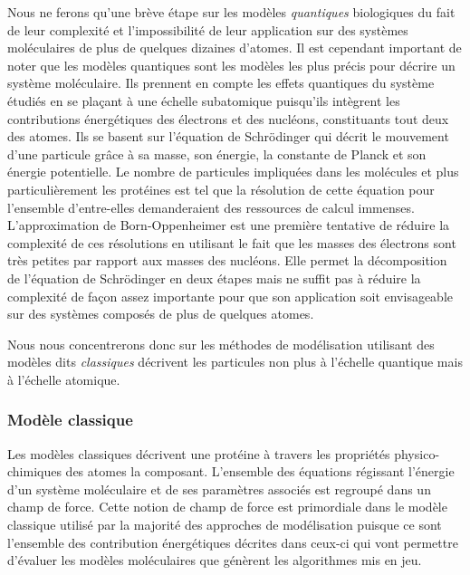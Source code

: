 Nous ne ferons qu'une brève étape sur les modèles \textit{quantiques} biologiques du fait de leur complexité et l'impossibilité de leur application sur des systèmes moléculaires de plus de quelques dizaines d'atomes. Il est cependant important de noter que les modèles quantiques sont les modèles les plus précis pour décrire un système moléculaire. Ils prennent en compte les effets quantiques du système étudiés en se plaçant à une échelle subatomique puisqu'ils intègrent les contributions énergétiques des électrons et des nucléons, constituants tout deux des atomes. Ils se basent sur l'équation de Schrödinger \cite{schrodinger1926undulatory} qui décrit le mouvement d'une particule grâce à sa masse, son énergie, la constante de Planck et son énergie potentielle. Le nombre de particules impliquées dans les molécules et plus particulièrement les protéines est tel que la résolution de cette équation pour l'ensemble d'entre-elles demanderaient des ressources de calcul immenses. L'approximation de Born-Oppenheimer \cite{} est une première tentative de réduire la complexité de ces résolutions en utilisant le fait que les masses des électrons sont très petites par rapport aux masses des nucléons. Elle permet la décomposition de l'équation de Schrödinger en deux étapes mais ne suffit pas à réduire la complexité de façon assez importante pour que son application soit envisageable sur des systèmes composés de plus de quelques atomes.

Nous nous concentrerons donc sur les méthodes de modélisation utilisant des modèles dits \textit{classiques} décrivent les particules non plus à l'échelle quantique mais à l'échelle atomique.

\subsubsection{Modèle classique} \label{forcefield}

Les modèles classiques décrivent une protéine à travers les propriétés physico-chimiques des atomes la composant. L'ensemble des équations régissant l'énergie d'un système moléculaire et de ses paramètres associés est regroupé dans un champ de force. Cette notion de champ de force est primordiale dans le modèle classique utilisé par la majorité des approches de modélisation puisque ce sont l'ensemble des contribution énergétiques décrites dans ceux-ci qui vont permettre d'évaluer les modèles moléculaires que génèrent les algorithmes mis en jeu.

